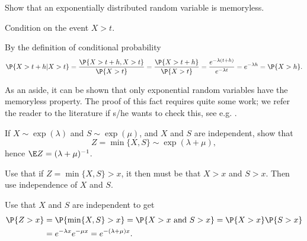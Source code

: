 \begin{exercise}
  Show that an exponentially distributed random variable is
  memoryless.  
  \begin{hint}
Condition on the event ${X>t}$. 
  \end{hint}
  \begin{solution}
By  the definition of conditional probability
\begin{equation*}
  \P{X>t+h|X>t} = \frac{\P{X>t+h, X>t}}{\P{X>t}} = \frac{\P{X>t+h}}{\P{X>t}} = \frac{e^{-\lambda(t+h)}}{e^{-\lambda t}} = e^{-\lambda h} = \P{X>h}.
\end{equation*}

As an aside,  it can be shown that only exponential random variables have the
memoryless property. The proof of this fact requires quite some work;
we refer the reader to the literature if s/he wants to check this, see
e.g. \citet[Appendix 3]{yushkevich69:_markov_proces}.
  \end{solution}
\end{exercise}




\begin{exercise}\label{ex:10}
  If $X\sim\exp(\lambda)$ and $S\sim\exp(\mu)$, and $X$ and $S$ are
  independent, show that 
  \begin{equation*}
Z=\min\{X,S\}\sim\exp(\lambda+\mu),
  \end{equation*}
hence $\E Z = (\lambda+\mu)^{-1}$.
\begin{hint}
Use that if $Z=\min\{X, S\}>x$,  it then must be that $X>x$
  and $S>x$. Then use independence of $X$ and $S$.
\end{hint}
  \begin{solution}
Use that $X$ and $S$ are independent to get
    \begin{equation*}
      \begin{split}
      \P{Z>x} 
&= \P{\min\{X,S\}>x} = \P{X>x\text{ and } S>x} = \P{X>x}\P{S>x} \\
&= e^{-\lambda x} e^{-\mu x} = e^{-(\lambda+\mu)x}.
      \end{split}
    \end{equation*}
  \end{solution}
\end{exercise}

